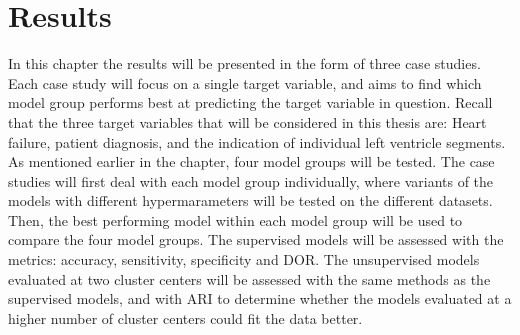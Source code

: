 \chapter{Results}

In this chapter the results will be presented in the form of three case studies. 
Each case study will focus on a single target variable, and aims to find which model group performs best at predicting the target variable in question.
Recall that the three target variables that will be considered in this thesis are: Heart failure, patient diagnosis, and the indication of individual left ventricle segments.
As mentioned earlier in the chapter, four model groups will be tested. 
The case studies will first deal with each model group individually, where variants of the models with different hypermarameters will be tested on the different datasets. 
Then, the best performing model within each model group will be used to compare the four model groups.
The supervised models will be assessed with the metrics: accuracy, sensitivity, specificity and DOR.
The unsupervised models evaluated at two cluster centers will be assessed with the same methods as the supervised models, and with ARI to determine 
whether the models evaluated at a higher number of cluster centers could fit the data better.




